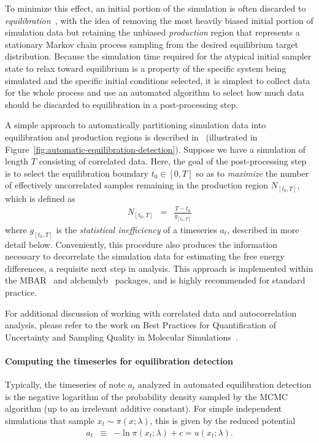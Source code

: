 \documentclass[9pt,bestpractices]{livecoms}
\begin{document}
To minimize this effect, an initial portion of the simulation is often discarded to \emph{equilibration}~\cite{braun2019best}, with the idea of removing the most heavily biased initial portion of simulation data but retaining the unbiased \emph{production} region that represents a stationary Markov chain process sampling from the desired equilibrium target distribution.
Because the simulation time required for the atypical initial sampler state to relax toward equilibrium is a property of the specific system being simulated and the specific initial conditions selected, it is simplest to collect data for the whole process and use an automated algorithm to select how much data should be discarded to equilibration in a post-processing step.

A simple approach to automatically partitioning simulation data into equilibration and production regions is described in~\cite{chodera2016simple} (illustrated in Figure~\ref{fig:automatic-equilibration-detection}).
Suppose we have a simulation of length $T$ consisting of correlated data.
Here, the goal of the post-processing step is to select the equilibration boundary $t_0 \in [0, T]$ so as to \emph{maximize} the number of effectively uncorrelated samples remaining in the production region $N_{[t_0,T]}$, which is defined as
\begin{eqnarray}
N_{[t_0,T]} &=& \frac{T - t_0}{g_{[t_0,T]}}
\end{eqnarray}
where $g_{[t_0,T]}$ is the \emph{statistical inefficiency} of a timeseries $a_t$, described in more detail below.
Conveniently, this procedure also produces the information necessary to decorrelate the simulation data for estimating the free energy differences, a requisite next step in analysis.
This approach is implemented within the MBAR~\cite{kylebeauchamp2019choderalab} and alchemlyb~\cite{daviddotson2019alchemistry} packages, and is highly recommended for standard practice.

For additional discussion of working with correlated data and autocorrelation analysis, please refer to the work on Best Practices for Quantification of Uncertainty and Sampling Quality in Molecular Simulations~\cite{grossfield2018best}.

\paragraph{Computing the timeseries for equilibration detection}
Typically, the timeseries of note $a_t$ analyzed in automated equilibration detection is the negative logarithm of the probability density sampled by the MCMC algorithm (up to an irrelevant additive constant).
For simple independent simulations that sample $x_t \sim \pi(x ; \lambda)$, this is given by the reduced potential
\begin{eqnarray}
a_t &\equiv& - \ln \pi(x_t; \lambda) + c = u(x_t; \lambda) .
\end{eqnarray}
\end{document}
